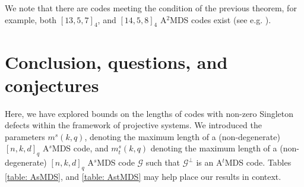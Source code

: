 \documentclass[11pt,a4paper]{amsart}
\newcommand{\G}{\mathcal{G}}
\theoremstyle{plain}
\theoremstyle{definition}
\theoremstyle{remark}
\begin{document}
	We note that there are codes meeting the condition of the previous theorem, for example, both $[13,5,7]_4$, and $[14,5,8]_4$  A$^2$MDS codes exist (see e.g. \cite{codetables.de}).

	\section{Conclusion, questions, and conjectures}

	Here, we have explored bounds on the lengths of codes with non-zero Singleton defects within the framework of projective systems.  We introduced the parameters $m^{s}(k,q)$, denoting the maximum length of a (non-degenerate) $[n,k,d]_q$ A$^s$MDS code, and  $m^{s}_t(k,q)$ denoting the maximum length of a (non-degenerate) $[n,k,d]_q$ A$^s$MDS code $\G$ such that  $\G^\perp$ is an  A$^t$MDS code. Tables \ref{table: AsMDS}, and \ref{table: AstMDS}  may help place our results in context.
\end{document}
